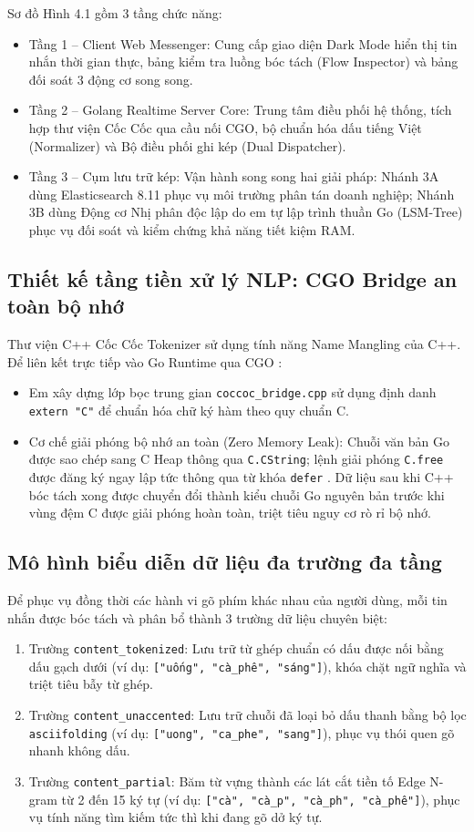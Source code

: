 \documentclass[12pt,a4paper,oneside]{report}
\begin{document}
Sơ đồ Hình 4.1 gồm 3 tầng chức năng:
\begin{itemize}
    \item Tầng 1 -- Client Web Messenger: Cung cấp giao diện Dark Mode hiển thị tin nhắn thời gian thực, bảng kiểm tra luồng bóc tách (Flow Inspector) và bảng đối soát 3 động cơ song song.
    \item Tầng 2 -- Golang Realtime Server Core: Trung tâm điều phối hệ thống, tích hợp thư viện Cốc Cốc qua cầu nối CGO, bộ chuẩn hóa dấu tiếng Việt (Normalizer) và Bộ điều phối ghi kép (Dual Dispatcher).
    \item Tầng 3 -- Cụm lưu trữ kép: Vận hành song song hai giải pháp: Nhánh 3A dùng Elasticsearch 8.11 phục vụ môi trường phân tán doanh nghiệp; Nhánh 3B dùng Động cơ Nhị phân độc lập do em tự lập trình thuần Go (LSM-Tree) phục vụ đối soát và kiểm chứng khả năng tiết kiệm RAM.
\end{itemize}

\subsection{Thiết kế tầng tiền xử lý NLP: CGO Bridge an toàn bộ nhớ}
Thư viện C++ Cốc Cốc Tokenizer \cite{ref5} sử dụng tính năng Name Mangling của C++. Để liên kết trực tiếp vào Go Runtime qua CGO \cite{ref6}:
\begin{itemize}
    \item Em xây dựng lớp bọc trung gian \texttt{coccoc\_bridge.cpp} sử dụng định danh \texttt{extern "C"} để chuẩn hóa chữ ký hàm theo quy chuẩn C.
    \item Cơ chế giải phóng bộ nhớ an toàn (Zero Memory Leak): Chuỗi văn bản Go được sao chép sang C Heap thông qua \texttt{C.CString}; lệnh giải phóng \texttt{C.free} được đăng ký ngay lập tức thông qua từ khóa \texttt{defer} \cite{ref6, ref7}. Dữ liệu sau khi C++ bóc tách xong được chuyển đổi thành kiểu chuỗi Go nguyên bản trước khi vùng đệm C được giải phóng hoàn toàn, triệt tiêu nguy cơ rò rỉ bộ nhớ.
\end{itemize}

\subsection{Mô hình biểu diễn dữ liệu đa trường đa tầng}
Để phục vụ đồng thời các hành vi gõ phím khác nhau của người dùng, mỗi tin nhắn được bóc tách và phân bổ thành 3 trường dữ liệu chuyên biệt:
\begin{enumerate}
    \item Trường \texttt{content\_tokenized}: Lưu trữ từ ghép chuẩn có dấu được nối bằng dấu gạch dưới (ví dụ: \texttt{["uống", "cà\_phê", "sáng"]}), khóa chặt ngữ nghĩa và triệt tiêu bẫy từ ghép.
    \item Trường \texttt{content\_unaccented}: Lưu trữ chuỗi đã loại bỏ dấu thanh bằng bộ lọc \texttt{asciifolding} (ví dụ: \texttt{["uong", "ca\_phe", "sang"]}), phục vụ thói quen gõ nhanh không dấu.
    \item Trường \texttt{content\_partial}: Băm từ vựng thành các lát cắt tiền tố Edge N-gram từ 2 đến 15 ký tự (ví dụ: \texttt{["cà", "cà\_p", "cà\_ph", "cà\_phê"]}), phục vụ tính năng tìm kiếm tức thì khi đang gõ dở ký tự.
\end{enumerate}
\end{document}
